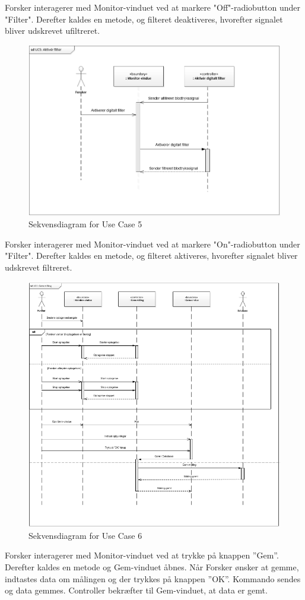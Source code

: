 Forsker interagerer med Monitor-vinduet ved at markere "Off"\--radiobutton under "Filter". Derefter kaldes en metode, og filteret deaktiveres, hvorefter signalet bliver udskrevet ufiltreret.

\begin{figure}[H]
	\centering
	\includegraphics[width=1\textwidth]{Figurer/UC5_SD}
	\caption{Sekvensdiagram for Use Case 5}
\end{figure}

Forsker interagerer med Monitor-vinduet ved at markere "On"\--radiobutton under "Filter". Derefter kaldes en metode, og filteret aktiveres, hvorefter signalet bliver udskrevet filtreret.

\begin{figure}[H]
	\centering
	\includegraphics[width=1\textwidth]{Figurer/UC6_SD}
	\caption{Sekvensdiagram for Use Case 6}
\end{figure}

Forsker interagerer med Monitor-vinduet ved at trykke på knappen ”Gem”. Derefter kaldes en metode og Gem-vinduet åbnes. Når Forsker ønsker at gemme, indtastes data om målingen og der trykkes på knappen ”OK”. Kommando sendes og data gemmes. Controller bekræfter til Gem-vinduet, at data er gemt.

